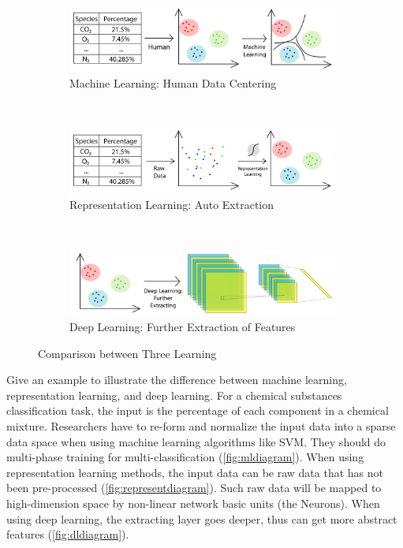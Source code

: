 \begin{spacing}{1.5}
\begin{figure}[ht]
    \centering
    \begin{subfigure}[b]{0.99\textwidth}
        \centering
        \includegraphics[width=0.98\textwidth, fbox]{Chapter2/Machine-Learing.pdf}
        \caption{Machine Learning: Human Data Centering}
        \label{fig:mldiagram} 
    \end{subfigure}%
    \\
    \begin{subfigure}[b]{0.99\textwidth}
        \centering
        \includegraphics[width=0.98\textwidth, fbox]{Chapter2/Represent-Learing.pdf}
        \caption{Representation Learning: Auto Extraction}
        \label{fig:representdiagram} 
    \end{subfigure}
    \\
    \begin{subfigure}[b]{0.99\textwidth}
        \centering
        \includegraphics[width=0.98\textwidth, fbox]{Chapter2/Deep-Learing.pdf}
        \caption{Deep Learning: Further Extraction of Features}
        \label{fig:dldiagram} 
    \end{subfigure}%
    \caption{Comparison between Three Learning}
\end{figure}

Give an example to illustrate the difference between machine learning, representation learning, and deep learning. For a chemical substances classification task, the input is the percentage of each component in a chemical mixture. Researchers have to re-form and normalize the input data into a sparse data space when using machine learning algorithms like SVM. They should do multi-phase training for multi-classification (\autoref{fig:mldiagram}). When using representation learning methods, the input data can be raw data that has not been pre-processed (\autoref{fig:representdiagram}). Such raw data will be mapped to high-dimension space by non-linear network basic units (the Neurons). When using deep learning, the extracting layer goes deeper, thus can get more abstract features (\autoref{fig:dldiagram}).


\end{spacing}
